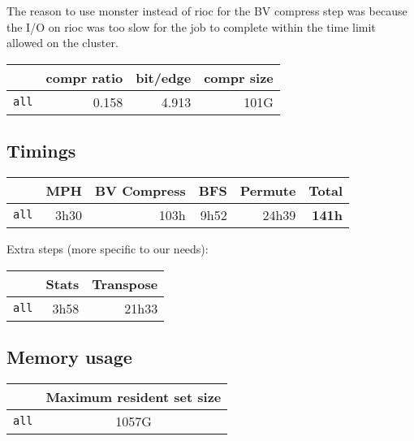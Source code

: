 \documentclass[11pt,a4paper]{article}
\begin{document}
The reason to use monster instead of rioc for the BV compress step was because
the I/O on rioc was too slow for the job to complete within the time limit
allowed on the cluster.

\begin{center}
    \begin{tabular}{@{} l *3r @{}}
        \toprule
        \multicolumn{1}{c}{} &
            \textbf{compr ratio} & \textbf{bit/edge} & \textbf{compr size} \\
        \midrule
        \texttt{all} & 0.158 & 4.913 & 101G \\
        \bottomrule
    \end{tabular}
\end{center}

\subsection{Timings}

\begin{center}
    \begin{tabular}{@{} l *5r @{}}
        \toprule
        \multicolumn{1}{c}{} &
            \textbf{MPH} &
            \textbf{BV Compress} &
            \textbf{BFS} &
            \textbf{Permute} &
            \textbf{Total} \\
        \midrule
        \texttt{all}
            & 3h30 & 103h & 9h52 & 24h39 & \textbf{141h} \\
        \bottomrule
    \end{tabular}
\end{center}

Extra steps (more specific to our needs):

\begin{center}
    \begin{tabular}{@{} l *2r @{}}
        \toprule
        \multicolumn{1}{c}{} &
            \textbf{Stats} &
            \textbf{Transpose} \\
        \midrule
        \texttt{all}
            & 3h58 & 21h33 \\
        \bottomrule
    \end{tabular}
\end{center}

\subsection{Memory usage}

\begin{center}
    \begin{tabular}{@{} l c @{}}
        \toprule
        \multicolumn{1}{c}{} &
            \textbf{Maximum resident set size} \\
        \midrule
        \texttt{all} & 1057G \\
        \bottomrule
    \end{tabular}
\end{center}
\end{document}
